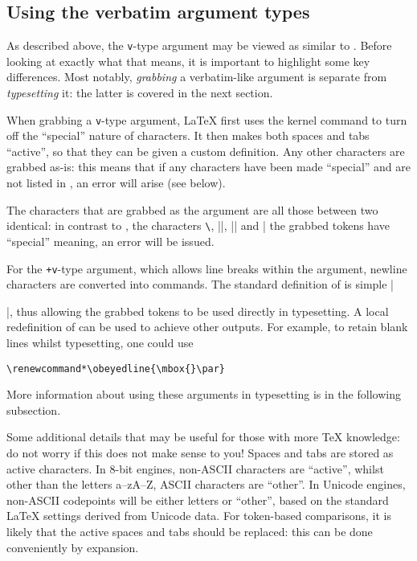 \documentclass{ltxguide}
\begin{document}
\subsection{Using the verbatim argument types}

As described above, the \texttt{v}-type argument may be viewed as similar to
. Before looking at exactly what that means, it is important to
highlight some key differences. Most notably, \emph{grabbing} a verbatim-like
argument is separate from \emph{typesetting} it: the latter is covered in the
next section.

When grabbing a \texttt{v}-type argument, \LaTeX{} first uses the kernel
command  to turn off the \enquote{special} nature of characters.
It then makes both spaces and tabs \enquote{active}, so that they can be given
a custom definition. Any other characters are grabbed as-is: this means that if
any characters have been made \enquote{special} and are not listed in
, an error will arise (see below).

The characters that are grabbed as the argument are all those between two
identical: in contrast to , the characters \texttt{\textbackslash},
|{|, |}| and |%
the grabbed tokens have \enquote{special} meaning, an error will be issued.

For the \texttt{+v}-type argument, which allows line breaks within the
argument, newline characters are converted into  commands. The
standard definition of  is simple |\par|, thus allowing the
grabbed tokens to be used directly in typesetting. A local redefinition of
 can be used to achieve other outputs. For example, to retain
blank lines whilst typesetting, one could use
\begin{verbatim}
\renewcommand*\obeyedline{\mbox{}\par}
\end{verbatim}
More information about using these arguments in typesetting is in the following
subsection.

Some additional details that may be useful for those with more \TeX{}
knowledge: do not worry if this does not make sense to you! Spaces and tabs are
stored as active characters. In $8$-bit engines, non-ASCII characters are
\enquote{active}, whilst other than the letters a--zA--Z, ASCII characters are
\enquote{other}. In Unicode engines, non-ASCII codepoints will be either
letters or \enquote{other}, based on the standard \LaTeX{} settings derived
from Unicode data. For token-based comparisons, it is likely that the active
spaces and tabs should be replaced: this can be done conveniently by expansion.
\end{document}
